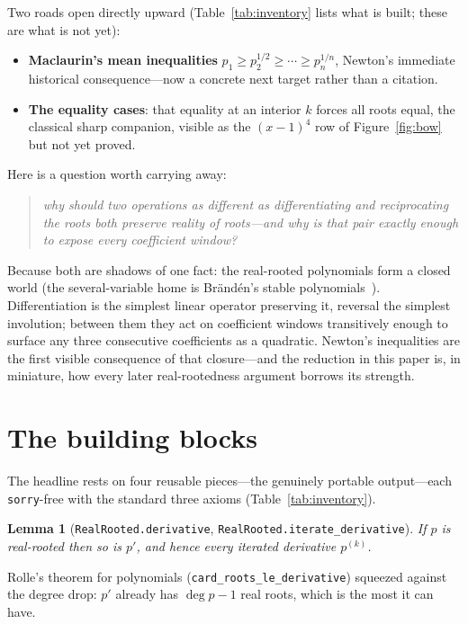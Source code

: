 \documentclass[11pt]{article}
\newtheorem{lemma}{Lemma}
\newcommand{\lean}[1]{\texttt{#1}}
\begin{document}
Two roads open directly upward (Table~\ref{tab:inventory} lists what is built; these are what is
not yet):
\begin{itemize}\itemsep1pt
\item \textbf{Maclaurin's mean inequalities} $p_1\ge p_2^{1/2}\ge\cdots\ge p_n^{1/n}$, Newton's
  immediate historical consequence---now a concrete next target rather than a citation.
\item \textbf{The equality cases}: that equality at an interior $k$ forces all roots equal, the
  classical sharp companion, visible as the $(x-1)^4$ row of Figure~\ref{fig:bow} but not yet
  proved.
\end{itemize}

Here is a question worth carrying away:
\begin{quote}\itshape
  why should two operations as different as \emph{differentiating} and \emph{reciprocating the
  roots} both preserve reality of roots---and why is that pair exactly enough to expose every
  coefficient window?
\end{quote}
Because both are shadows of one fact: the real-rooted polynomials form a closed world (the
several-variable home is Br\"and\'en's stable polynomials~\cite{Branden2015}). Differentiation is
the simplest linear operator preserving it, reversal the simplest involution; between them they act
on coefficient windows transitively enough to surface any three consecutive coefficients as a
quadratic. Newton's inequalities are the first visible consequence of that closure---and the
reduction in this paper is, in miniature, how every later real-rootedness argument borrows its
strength.

\section{The building blocks}\label{sec:blocks}

The headline rests on four reusable pieces---the genuinely portable output---each \lean{sorry}-free
with the standard three axioms (Table~\ref{tab:inventory}).

\begin{lemma}[\lean{RealRooted.derivative}, \lean{RealRooted.iterate\_derivative}]
If $p$ is real-rooted then so is $p'$, and hence every iterated derivative $p^{(k)}$.
\end{lemma}
Rolle's theorem for polynomials (\lean{card\_roots\_le\_derivative}) squeezed against the degree
drop: $p'$ already has $\deg p-1$ real roots, which is the most it can have.
\end{document}
